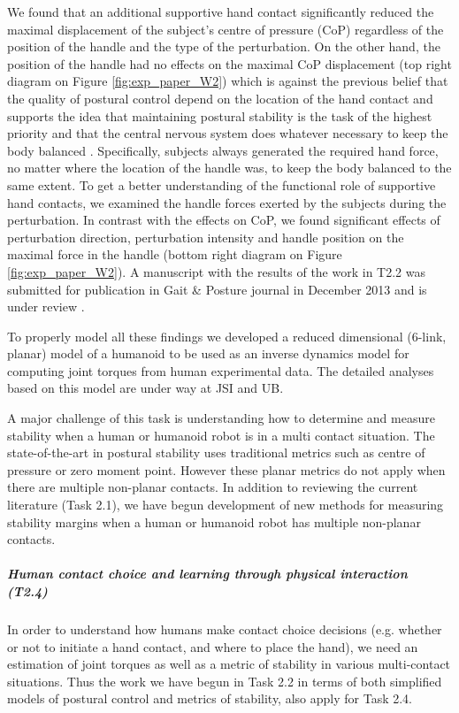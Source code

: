We found that an additional supportive hand contact significantly reduced the maximal displacement of the subject's centre of pressure (CoP) regardless of the position of the handle and the type of the perturbation. On the other hand, the position of the handle had no effects on the maximal CoP displacement (top right diagram on Figure \ref{fig:exp_paper_W2}) which is against the previous belief that the quality of postural control depend on the location of the hand contact \cite{Sarraf2014} and supports the idea that maintaining postural stability is the task of the highest priority and that the central nervous system does whatever necessary to keep the body balanced \cite{Winter1995}. Specifically, subjects always generated the required hand force, no matter where the location of the handle was, to keep the body balanced to the same extent. To get a better understanding of the functional role of supportive hand contacts, we examined the handle forces exerted by the subjects during the perturbation. In 
contrast with the effects on CoP, we found significant effects of perturbation direction, perturbation intensity and handle position on the maximal force in the handle (bottom right diagram on Figure \ref{fig:exp_paper_W2}). A manuscript with the results of the work in T2.2 was submitted for publication in Gait \& Posture journal in December 2013 and is under review \cite{Babic2014}.

To properly model all these findings we developed a reduced dimensional (6-link, planar) model of a humanoid to be used as an inverse dynamics model for computing joint torques from human experimental data. The detailed analyses based on this model are under way at JSI and UB.

A major challenge of this task is understanding how to determine and measure stability when a human or humanoid robot is in a multi contact situation. The state-of-the-art in postural stability uses traditional metrics such as centre of pressure or zero moment point. However these planar metrics do not apply when there are multiple non-planar contacts. In addition to reviewing the current literature (Task 2.1), we have begun development of new methods for measuring stability margins when a human or humanoid robot has multiple non-planar contacts.

\subparagraph{Human contact choice and learning through physical interaction (T2.4)}

In order to understand how humans make contact choice decisions (e.g. whether or not to initiate a hand contact, and where to place the hand), we need an estimation of joint torques as well as a metric of stability in various multi-contact situations. Thus the work we have begun in Task 2.2 in terms of both simplified models of postural control and metrics of stability, also apply for Task 2.4.

